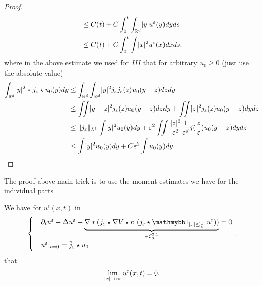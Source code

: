 \begin{proof}
\begin{align*}
       &\le C(t) + C \int_0^{t}  \int_{\mathbb{R}^{d} } \lvert y\rvert u^{\varepsilon} (y) dy ds\\
       &\le  C(t) + C\int_0^{t} \int  \lvert x\rvert^2 u^{\varepsilon}(x) dx ds
  .\end{align*}
  where in the above estimate we used for  $III$ that for arbitrary $u_{0}\ge 0$ (just use the absolute value)
  \begin{align*}
    \int_{\mathbb{R}^{d} } \lvert y\rvert^2*j_{\varepsilon}\star u_{0}(y) dy &\le \int_{\mathbb{R}^{d} } \int_{\mathbb{R}^{d} } \lvert y\rvert^2 j_{\varepsilon}j_{\varepsilon}(z) u_0(y-z)dz dy\\
                                                                   &\le  \iint \lvert y-z\rvert^2 j_{\varepsilon}(z) u_{0}(y-z) dz dy + \iint \lvert z\rvert^2 j_{\varepsilon}(z)u_{0}(y-z) dy dz \\
                                                                   &\le  \|j_{\varepsilon}\|_{L^{1} } \int \lvert y\rvert^2 u_{0}(y) dy  + \varepsilon^2 \iint \frac{\lvert z\rvert^2}{\varepsilon ^2} \frac{1}{\varepsilon ^{d} }j(\frac{z}{\varepsilon}) u_0(y-z) dy dz \\
                                                                   &\le \int \lvert y\rvert^2 u_0(y) dy + C \varepsilon^2 \int u_{0}(y) dy
  .\end{align*}
   \end{proof}
   \begin{remark}
   The proof above main trick is to use the moment estimates we have for the individual parts 
   \end{remark}
   \begin{lemma}
   We have for $u^{\epsilon}(x,t) $  in 
 \begin{align*}
  \begin{cases}
    &\partial_t u^{\epsilon}  - \Delta u^{\epsilon}  + \underbrace{\nabla*(j_{\epsilon}\star \nabla V \star  v \ (j_{\epsilon} \star \cha_{\abs{x}\le \frac{1}{\epsilon}} \ u^{\epsilon} ))}_{\in \mathcal{C}_0^{2,1} } = 0 \\ 
    &u^{\epsilon}  \rvert_{t=0} = \tilde{j}_{\epsilon} \star  u_{0}
  \end{cases}
 .\end{align*}
 that 
 \begin{align*}
   \lim_{\abs{x} \to \infty} u^{\epsilon}(x,t) = 0
 .\end{align*}
   \end{lemma}
